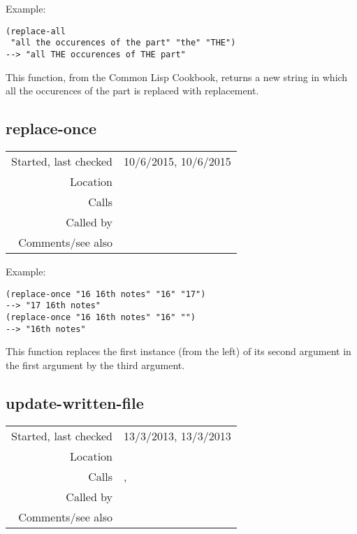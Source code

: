 \vspace{0.5cm}
\noindent Example:
\begin{verbatim}
(replace-all
 "all the occurences of the part" "the" "THE")
--> "all THE occurences of THE part"
\end{verbatim}

\noindent This function, from the Common Lisp
Cookbook, returns a new string in which all the
occurences of the part is replaced with
replacement.


\subsection*{replace-once}\label{fun:replace-once}

\vspace{0.3cm}
\begin{tabular}{r|p{8cm}}
Started, last checked & 10/6/2015, 10/6/2015 \\
Location & \nameref{sec:text-files} \\
Calls & \\
Called by & \nameref{fun:number-string2numberless-string} \\
Comments/see also &
\end{tabular}

\vspace{0.5cm}
\noindent Example:
\begin{verbatim}
(replace-once "16 16th notes" "16" "17")
--> "17 16th notes"
(replace-once "16 16th notes" "16" "")
--> "16th notes"
\end{verbatim}

\noindent This function replaces the first instance
(from the left) of its second argument in the first
argument by the third argument.


\subsection*{update-written-file}\label{fun:update-written-file}

\vspace{0.3cm}
\begin{tabular}{r|p{8cm}}
Started, last checked & 13/3/2013, 13/3/2013 \\
Location & \nameref{sec:text-files} \\
Calls & \nameref{fun:read-from-file}, \nameref{fun:write-to-file} \\
Called by & \nameref{fun:SIA-reflected} \\
Comments/see also &
\end{tabular}

